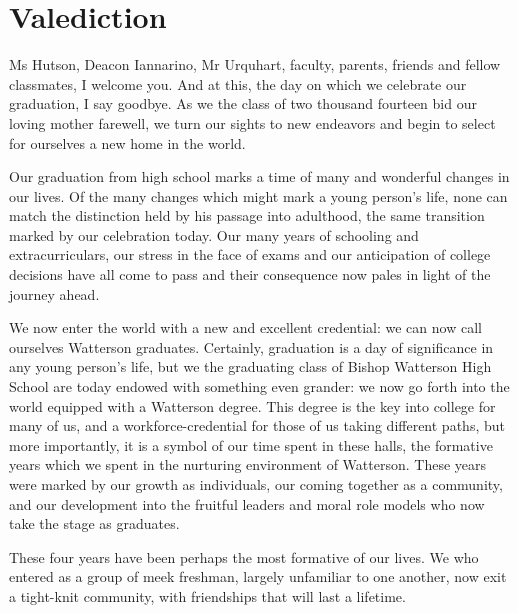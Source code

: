 \documentclass{report}
\begin{document}
\section*{Valediction}

Ms Hutson, Deacon Iannarino, Mr Urquhart, faculty, parents, friends and fellow
classmates, I welcome you. And at this, the day on which we celebrate our
graduation, I say goodbye. As we the class of two thousand fourteen bid our
loving mother farewell, we turn our sights to new endeavors and begin to select
for ourselves a new home in the world.

Our graduation from high school marks a time of many and wonderful changes in
our lives. Of the many changes which might mark a young person's life, none can
match the distinction held by his passage into adulthood, the same transition
marked by our celebration today. Our many years of schooling and
extracurriculars, our stress in the face of exams and our anticipation of
college decisions have all come to pass and their consequence now pales in light
of the journey ahead. 

We now enter the world with a new and excellent credential: we can now call
ourselves Watterson graduates. Certainly, graduation is a day of significance
in any young person's life, but we the graduating class of Bishop Watterson
High School are today endowed with something even grander: we now go forth into
the world equipped with a Watterson degree. This degree is the key into college
for many of us, and a workforce-credential for those of us taking different
paths, but more importantly, it is a symbol of our time spent in these halls,
the formative years which we spent in the nurturing environment of Watterson.
These years were marked by our growth as individuals, our coming together as a
community, and our development into the fruitful leaders and moral role models
who now take the stage as graduates.

These four years have been perhaps the most formative of our lives. We who
entered as a group of meek freshman, largely unfamiliar to one another, now
exit a tight-knit community, with friendships that will last a lifetime.
\end{document}
